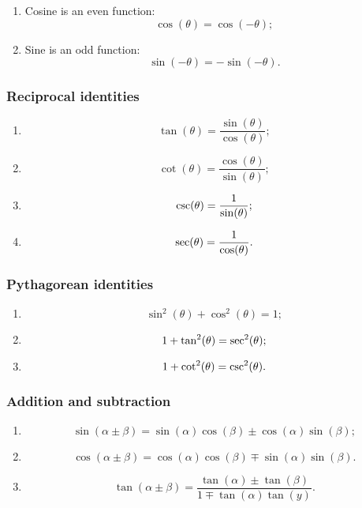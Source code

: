 \documentclass[12pt, a4paper]{article}
\newcommand{\f}[2]{\frac{#1}{#2}}
\theoremstyle{definition}
\theoremstyle{plain}
\begin{document}
\begin{enumerate}
	
	\item Cosine is an even function: $$\cos(\theta)=\cos(-\theta);$$

	\item Sine is an odd function: $$\sin(-\theta)=-\sin(-\theta).$$

\end{enumerate}

\subsubsection*{Reciprocal identities}

\begin{enumerate}
	
	\item $$\tan(\theta)=\f{\sin(\theta)}{\cos(\theta)};$$

	\item $$\cot(\theta)=\f{\cos{(\theta)}}{\sin(\theta)};$$

	\item $$\cosecant(\theta)=\f{1}{\sin(\theta)};$$

	\item $$\secant(\theta) =\f{1}{\cos(\theta)}.$$

\end{enumerate}

\subsubsection*{Pythagorean identities}

\begin{enumerate}
	
	\item $$\sin^2(\theta)+\cos^2(\theta)=1;$$

	\item $$1+\tan^2(\theta)=\secant^2(\theta);$$

	\item $$1+\cotangent^2(\theta)=\cosecant^2(\theta).$$

\end{enumerate}

\subsubsection*{Addition and subtraction}

\begin{enumerate}
	
	\item $$\sin(\alpha\pm \beta)=\sin(\alpha)\cos(\beta)\pm\cos(\alpha)\sin(\beta);$$

	\item $$\cos(\alpha\pm \beta)=\cos(\alpha)\cos(\beta)\mp \sin(\alpha)\sin(\beta).$$

	\item $$\tan(\alpha\pm \beta)=\f{\tan(\alpha)\pm\tan(\beta)}{1\mp\tan(\alpha)\tan(y)}.$$

\end{enumerate}
\end{document}
